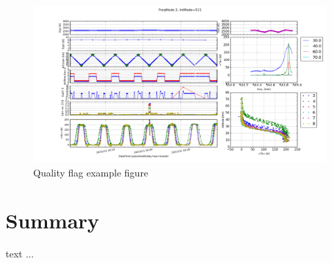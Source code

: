 \begin{figure}[t]
\includegraphics[width=14cm]{quality_control.png}
\caption{Quality flag example figure}
\label{fig:quality}
\end{figure}

    




\chapter{Summary}

text ...


